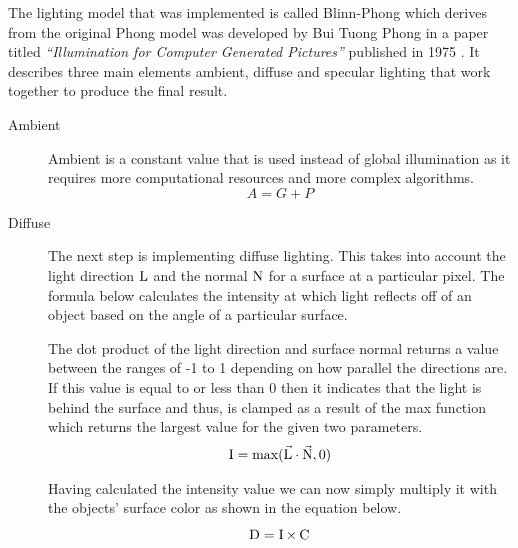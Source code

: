 \documentclass[11pt]{article}
\begin{document}
The lighting model that was implemented is called Blinn-Phong which derives from
the original Phong model was developed by Bui Tuong Phong in a paper titled
\textit{``Illumination for Computer Generated Pictures''} published in 1975
\cite{blinn}. It describes three main elements ambient, diffuse and specular
lighting that work together to produce the final result.

\begin{description}
  \item[Ambient] Ambient is a constant value that is used instead of global illumination
    as it requires more computational resources and more complex algorithms.
    \begin{equation}
      A = G + P
    \end{equation}
  \item[Diffuse] The next step is implementing diffuse lighting. This takes into
    account the light direction $\operatorname{L}$ and the normal $\operatorname{N}$ for a
    surface at a particular pixel. The formula below calculates the intensity at
    which light reflects off of an object based on the angle of a particular
    surface.
    
    The dot product of the light direction and surface normal returns a value
    between the ranges of -1 to 1 depending on how parallel the directions are.
    If this value is equal to or less than 0 then it indicates that the light is
    behind the surface and thus, is clamped as a result of the max function
    which returns the largest value for the given two parameters.
    \begin{gather}
      \operatorname{I} = \operatorname{max}(\vec{\operatorname{L}} \cdot \vec{\operatorname{N}}, 0) \\
    \end{gather}
    
    Having calculated the intensity value we can now simply multiply it with the
    objects' surface color as shown in the equation below.
    \begin{equation}
      \operatorname{D} = \operatorname{I} \times \operatorname{C}
    \end{equation}
    

\end{description}
\end{document}

